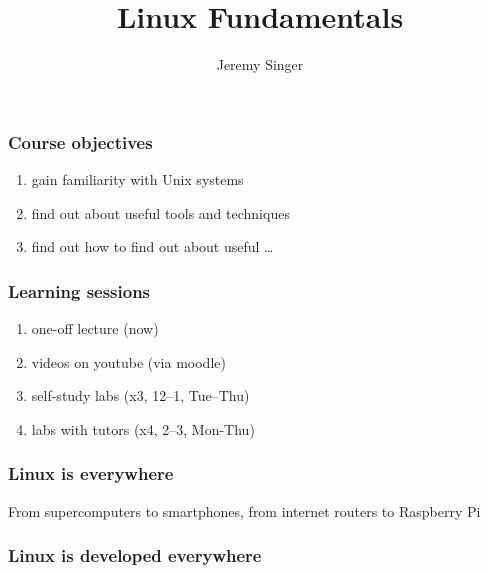 \documentclass{beamer}
\begin{document}
\title{Linux Fundamentals}
\author{Jeremy Singer}

\frame{\titlepage}

\begin{frame}
\frametitle{Course objectives}
\begin{enumerate}
\item gain familiarity with Unix systems
\item find out about useful tools and techniques
  \item find out how to find out about useful \ldots
\end{enumerate}
\end{frame}

\begin{frame}
\frametitle{Learning sessions}
\begin{enumerate}
\item one-off lecture (now)
\item videos on youtube (via moodle)
\item self-study labs (x3, 12--1, Tue--Thu)
\item labs with tutors (x4, 2--3, Mon-Thu)
\end{enumerate}
\end{frame}


\begin{frame}
\frametitle{Linux is everywhere}

From supercomputers to smartphones, from internet routers to Raspberry Pi
\end{frame}


\begin{frame}
\frametitle{Linux is developed everywhere}



\end{frame}
\end{document}
